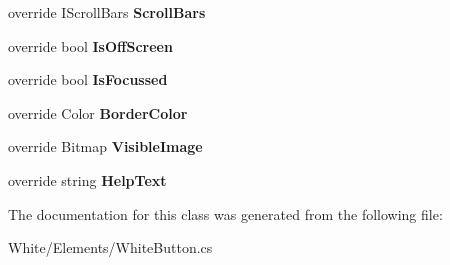 \begin{DoxyCompactItemize}
\item 
\hypertarget{class_proto_test_1_1_golem_1_1_white_1_1_elements_1_1_white_button_ab9aaacc62b138786dd8187c305256de2}{override I\-Scroll\-Bars {\bfseries Scroll\-Bars}}\label{class_proto_test_1_1_golem_1_1_white_1_1_elements_1_1_white_button_ab9aaacc62b138786dd8187c305256de2}

\item 
\hypertarget{class_proto_test_1_1_golem_1_1_white_1_1_elements_1_1_white_button_ad359e218e5186d111a08852043b6f0c5}{override bool {\bfseries Is\-Off\-Screen}}\label{class_proto_test_1_1_golem_1_1_white_1_1_elements_1_1_white_button_ad359e218e5186d111a08852043b6f0c5}

\item 
\hypertarget{class_proto_test_1_1_golem_1_1_white_1_1_elements_1_1_white_button_a70c425925a29c05e9de0c7ed6587d623}{override bool {\bfseries Is\-Focussed}}\label{class_proto_test_1_1_golem_1_1_white_1_1_elements_1_1_white_button_a70c425925a29c05e9de0c7ed6587d623}

\item 
\hypertarget{class_proto_test_1_1_golem_1_1_white_1_1_elements_1_1_white_button_a3d698f4646f72730ead319cfebce89db}{override Color {\bfseries Border\-Color}}\label{class_proto_test_1_1_golem_1_1_white_1_1_elements_1_1_white_button_a3d698f4646f72730ead319cfebce89db}

\item 
\hypertarget{class_proto_test_1_1_golem_1_1_white_1_1_elements_1_1_white_button_a6de10b30b41b63c0ee83f71f84b25ddb}{override Bitmap {\bfseries Visible\-Image}}\label{class_proto_test_1_1_golem_1_1_white_1_1_elements_1_1_white_button_a6de10b30b41b63c0ee83f71f84b25ddb}

\item 
\hypertarget{class_proto_test_1_1_golem_1_1_white_1_1_elements_1_1_white_button_a408dc4febe5c249f15ca6b44e961a503}{override string {\bfseries Help\-Text}}\label{class_proto_test_1_1_golem_1_1_white_1_1_elements_1_1_white_button_a408dc4febe5c249f15ca6b44e961a503}

\end{DoxyCompactItemize}


The documentation for this class was generated from the following file\-:\begin{DoxyCompactItemize}
\item 
White/\-Elements/White\-Button.\-cs\end{DoxyCompactItemize}
